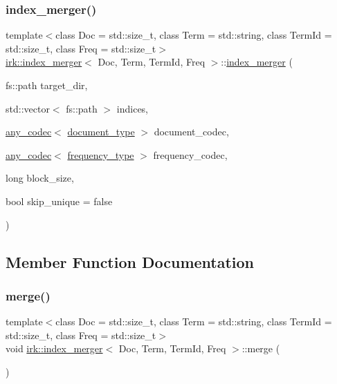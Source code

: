 \subsubsection{\texorpdfstring{index\+\_\+merger()}{index\_merger()}}
{\footnotesize\ttfamily template$<$class Doc = std\+::size\+\_\+t, class Term = std\+::string, class Term\+Id = std\+::size\+\_\+t, class Freq = std\+::size\+\_\+t$>$ \\
\mbox{\hyperlink{classirk_1_1index__merger}{irk\+::index\+\_\+merger}}$<$ Doc, Term, Term\+Id, Freq $>$\+::\mbox{\hyperlink{classirk_1_1index__merger}{index\+\_\+merger}} (\begin{DoxyParamCaption}\item[{fs\+::path}]{target\+\_\+dir,  }\item[{std\+::vector$<$ fs\+::path $>$}]{indices,  }\item[{\mbox{\hyperlink{namespaceirk_a831a3a869cf19601dbfb5c41765a2e87}{any\+\_\+codec}}$<$ \mbox{\hyperlink{classirk_1_1index__merger_ace9b689f5d38f6aeed3ce16f0f1bd260}{document\+\_\+type}} $>$}]{document\+\_\+codec,  }\item[{\mbox{\hyperlink{namespaceirk_a831a3a869cf19601dbfb5c41765a2e87}{any\+\_\+codec}}$<$ \mbox{\hyperlink{classirk_1_1index__merger_a6cb409ab2e737118969206ee9b27d147}{frequency\+\_\+type}} $>$}]{frequency\+\_\+codec,  }\item[{long}]{block\+\_\+size,  }\item[{bool}]{skip\+\_\+unique = {\ttfamily false} }\end{DoxyParamCaption})\hspace{0.3cm}{\ttfamily [inline]}}



\subsection{Member Function Documentation}
\mbox{\label{classirk_1_1index__merger_a500ccb6d5fb8106183dc94abf6d64a5f}} 
\subsubsection{\texorpdfstring{merge()}{merge()}}
{\footnotesize\ttfamily template$<$class Doc = std\+::size\+\_\+t, class Term = std\+::string, class Term\+Id = std\+::size\+\_\+t, class Freq = std\+::size\+\_\+t$>$ \\
void \mbox{\hyperlink{classirk_1_1index__merger}{irk\+::index\+\_\+merger}}$<$ Doc, Term, Term\+Id, Freq $>$\+::merge (\begin{DoxyParamCaption}{ }\end{DoxyParamCaption})\hspace{0.3cm}{\ttfamily [inline]}}

